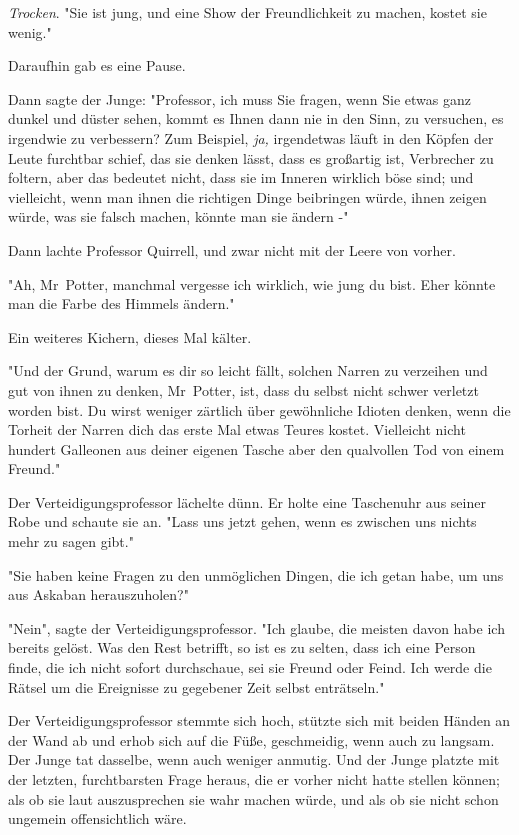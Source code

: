 {\emph{Trocken}. "Sie ist jung, und eine Show der Freundlichkeit zu machen, kostet sie wenig."

Daraufhin gab es eine Pause.

Dann sagte der Junge: "Professor, ich muss Sie fragen, wenn Sie etwas ganz dunkel und düster sehen, kommt es Ihnen dann nie in den Sinn, zu versuchen, es irgendwie zu verbessern? Zum Beispiel, \emph{ja,} irgendetwas läuft in den Köpfen der Leute furchtbar schief, das sie denken lässt, dass es großartig ist, Verbrecher zu foltern, aber das bedeutet nicht, dass sie im Inneren wirklich böse sind; und vielleicht, wenn man ihnen die richtigen Dinge beibringen würde, ihnen zeigen würde, was sie falsch machen, könnte man sie ändern -"

Dann lachte Professor Quirrell, und zwar nicht mit der Leere von vorher.

"Ah, Mr~Potter, manchmal vergesse ich wirklich, wie jung du bist. Eher könnte man die Farbe des Himmels ändern."

Ein weiteres Kichern, dieses Mal kälter.

"Und der Grund, warum es dir so leicht fällt, solchen Narren zu verzeihen und gut von ihnen zu denken, Mr~Potter, ist, dass du selbst nicht schwer verletzt worden bist. Du wirst weniger zärtlich über gewöhnliche Idioten denken, wenn die Torheit der Narren dich das erste Mal etwas Teures kostet. Vielleicht nicht hundert Galleonen aus deiner eigenen Tasche aber den qualvollen Tod von einem Freund."

Der Verteidigungsprofessor lächelte dünn. Er holte eine Taschenuhr aus seiner Robe und schaute sie an. "Lass uns jetzt gehen, wenn es zwischen uns nichts mehr zu sagen gibt."

"Sie haben keine Fragen zu den unmöglichen Dingen, die ich getan habe, um uns aus Askaban herauszuholen?"

"Nein", sagte der Verteidigungsprofessor. "Ich glaube, die meisten davon habe ich bereits gelöst. Was den Rest betrifft, so ist es zu selten, dass ich eine Person finde, die ich nicht sofort durchschaue, sei sie Freund oder Feind. Ich werde die Rätsel um die Ereignisse zu gegebener Zeit selbst enträtseln."

Der Verteidigungsprofessor stemmte sich hoch, stützte sich mit beiden Händen an der Wand ab und erhob sich auf die Füße, geschmeidig, wenn auch zu langsam. Der Junge tat dasselbe, wenn auch weniger anmutig. Und der Junge platzte mit der letzten, furchtbarsten Frage heraus, die er vorher nicht hatte stellen können; als ob sie laut auszusprechen sie wahr machen würde, und als ob sie nicht schon ungemein offensichtlich wäre.

}

